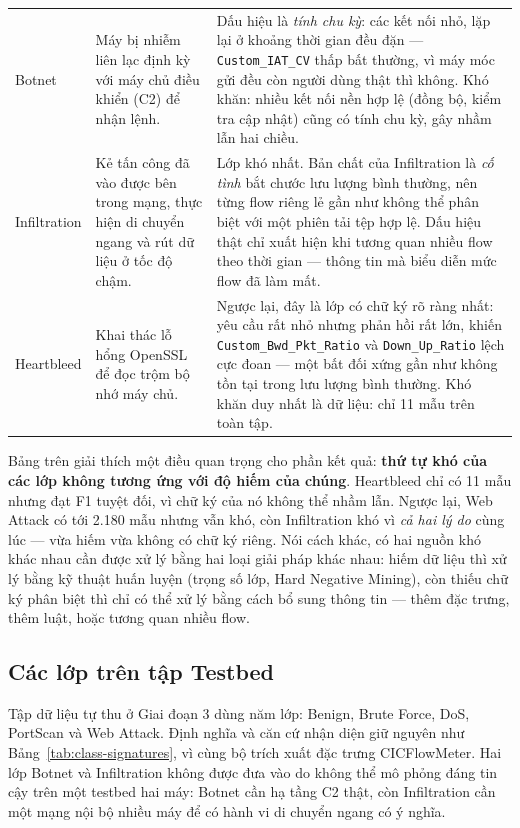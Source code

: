 \documentclass[../DoAn.tex]{subfiles}
\begin{document}
\begin{table}[H]
{\begin{tabular}{p{2.2cm}p{5.4cm}p{7.0cm}}
        Botnet & Máy bị nhiễm liên lạc định kỳ với máy chủ điều khiển (C2) để nhận lệnh. &
        Dấu hiệu là \textit{tính chu kỳ}: các kết nối nhỏ, lặp lại ở khoảng thời gian đều đặn --- \texttt{Custom\_IAT\_CV} thấp bất thường, vì máy móc gửi đều còn người dùng thật thì không. Khó khăn: nhiều kết nối nền hợp lệ (đồng bộ, kiểm tra cập nhật) cũng có tính chu kỳ, gây nhầm lẫn hai chiều. \\[2pt]

        Infiltration & Kẻ tấn công đã vào được bên trong mạng, thực hiện di chuyển ngang và rút dữ liệu ở tốc độ chậm. &
        Lớp khó nhất. Bản chất của Infiltration là \textit{cố tình} bắt chước lưu lượng bình thường, nên từng flow riêng lẻ gần như không thể phân biệt với một phiên tải tệp hợp lệ. Dấu hiệu thật chỉ xuất hiện khi tương quan nhiều flow theo thời gian --- thông tin mà biểu diễn mức flow đã làm mất. \\[2pt]

        Heartbleed & Khai thác lỗ hổng OpenSSL để đọc trộm bộ nhớ máy chủ. &
        Ngược lại, đây là lớp có chữ ký rõ ràng nhất: yêu cầu rất nhỏ nhưng phản hồi rất lớn, khiến \texttt{Custom\_Bwd\_Pkt\_Ratio} và \texttt{Down\_Up\_Ratio} lệch cực đoan --- một bất đối xứng gần như không tồn tại trong lưu lượng bình thường. Khó khăn duy nhất là dữ liệu: chỉ 11 mẫu trên toàn tập. \\
        \hline
    \end{tabular}%
    }
\end{table}

Bảng trên giải thích một điều quan trọng cho phần kết quả: \textbf{thứ tự khó của các lớp không tương ứng với độ hiếm của chúng}. Heartbleed chỉ có 11 mẫu nhưng đạt F1 tuyệt đối, vì chữ ký của nó không thể nhầm lẫn. Ngược lại, Web Attack có tới 2.180 mẫu nhưng vẫn khó, còn Infiltration khó vì \textit{cả hai lý do} cùng lúc --- vừa hiếm vừa không có chữ ký riêng. Nói cách khác, có hai nguồn khó khác nhau cần được xử lý bằng hai loại giải pháp khác nhau: hiếm dữ liệu thì xử lý bằng kỹ thuật huấn luyện (trọng số lớp, Hard Negative Mining), còn thiếu chữ ký phân biệt thì chỉ có thể xử lý bằng cách bổ sung thông tin --- thêm đặc trưng, thêm luật, hoặc tương quan nhiều flow.

\subsection{Các lớp trên tập Testbed}
\label{subsec:lop-testbed}

Tập dữ liệu tự thu ở Giai đoạn 3 dùng năm lớp: Benign, Brute Force, DoS, PortScan và Web Attack. Định nghĩa và căn cứ nhận diện giữ nguyên như Bảng~\ref{tab:class-signatures}, vì cùng bộ trích xuất đặc trưng CICFlowMeter. Hai lớp Botnet và Infiltration không được đưa vào do không thể mô phỏng đáng tin cậy trên một testbed hai máy: Botnet cần hạ tầng C2 thật, còn Infiltration cần một mạng nội bộ nhiều máy để có hành vi di chuyển ngang có ý nghĩa.
\end{document}
